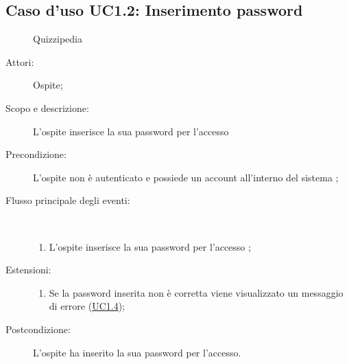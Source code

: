 \subsection{Caso d'uso UC1.2: Inserimento password}
	\begin{figure}[H]
		\centering
		\begin{resizedtikzpicture}{\textwidth}
		\begin{umlsystem}[x=0, fill=lightgray!20]{Quizzipedia}
		\end{umlsystem}
		\end{resizedtikzpicture}
		\caption{}
	\end{figure}
\begin{description}
\item[Attori:] Ospite;
\item[Scopo e descrizione:] L'ospite inserisce la sua password per l'accesso
      \item[Precondizione:] L'ospite non è autenticato e possiede un account all'interno del sistema
;

        \item[Flusso principale degli eventi:] \ 
 \begin{enumerate}
          \item L'ospite inserisce la sua password per l'accesso
;

      \end{enumerate}
    \item[Estensioni:]
      \begin{enumerate}
          \item Se la password inserita non è corretta viene visualizzato un messaggio di errore (\hyperlink{UC1.4}{UC1.4});

      \end{enumerate}
    \item[Postcondizione:] L'ospite ha inserito la sua password per l'accesso.
  \end{description}
\hypertarget{UC1.3}{}
